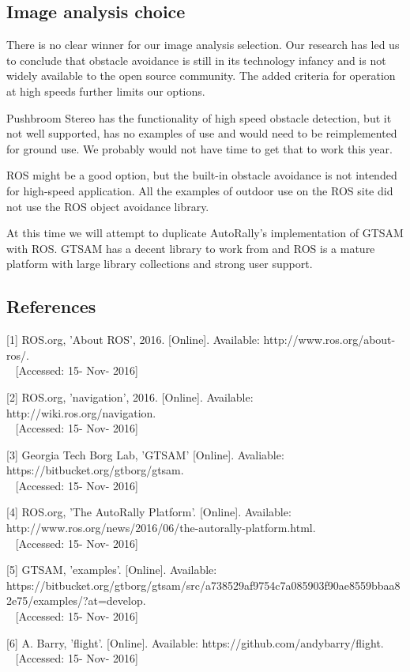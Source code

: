 \documentclass[compsoc,draftclsnofoot,onecolumn,10pt]{IEEEtran}
\begin{document}
\subsection{Image analysis choice}
There is no clear winner for our image analysis selection. Our research has led
us to conclude that obstacle avoidance is still in its technology infancy and is
not widely available to the open source community. The added criteria for
operation at high speeds further limits our options.\par
Pushbroom Stereo has the functionality of high speed obstacle detection, but it
not well supported, has no examples of use and would need to be reimplemented
for ground use. We probably would not have time to get that to work this
year.\par
ROS might be a good option, but the built-in obstacle avoidance is not intended for
high-speed application. All the examples of outdoor use on the ROS site did not
use the ROS object avoidance library.\par
At this time we will attempt to duplicate AutoRally's implementation
of GTSAM with ROS. GTSAM has a decent library to work from and ROS is a mature
platform with large library collections and strong user support. 

\subsection{References}
[1] ROS.org, 'About ROS', 2016. [Online]. Available: http://www.ros.org/about-ros/.\\~
[Accessed: 15- Nov- 2016]

[2] ROS.org, 'navigation', 2016. [Online]. Available: http://wiki.ros.org/navigation.\\~
[Accessed: 15- Nov- 2016]

[3] Georgia Tech Borg Lab, 'GTSAM' [Online]. Avaliable:
https://bitbucket.org/gtborg/gtsam.\\~
[Accessed: 15- Nov- 2016]

[4] ROS.org, 'The AutoRally Platform'. [Online]. Available: http://www.ros.org/news/2016/06/the-autorally-platform.html.\\~
[Accessed: 15- Nov- 2016]

[5] GTSAM, 'examples'. [Online]. Available:
https://bitbucket.org/gtborg/gtsam/src/a738529af9754c7a085903f90ae8559bbaa82e75/examples/?at=develop.\\~
[Accessed: 15- Nov- 2016]

[6] A. Barry, 'flight'. [Online]. Available:
https://github.com/andybarry/flight.\\~
[Accessed: 15- Nov- 2016]
\end{document}
